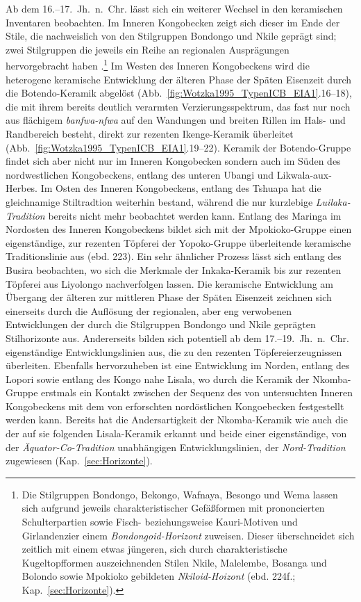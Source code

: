 Ab dem 16.--17.~Jh.~n.~Chr. lässt sich ein weiterer Wechsel in den keramischen Inventaren beobachten. Im Inneren Kongobecken zeigt sich dieser im Ende der Stile, die nachweislich von den Stilgruppen Bondongo und Nkile geprägt sind; zwei Stilgruppen die jeweils ein Reihe an regionalen Ausprägungen hervorgebracht haben \parencite[224f.]{Wotzka.1995}.\footnote{Die Stilgruppen Bondongo, Bekongo, Wafnaya, Besongo und Wema lassen sich aufgrund jeweils charakteristischer Gefäßformen mit prononcierten Schulterpartien sowie Fisch- beziehungsweise Kauri-Motiven und Girlandenzier einem \textit{Bondongoid-Horizont} zuweisen. Dieser überschneidet sich zeitlich mit einem etwas jüngeren, sich durch charakteristische Kugeltopfformen auszeichnenden Stilen Nkile, Malelembe, Bosanga und Bolondo sowie Mpokioko gebildeten \textit{Nkiloid-Hoizont} (ebd. 224f.; Kap.~\ref{sec:Horizonte}).} Im Westen des Inneren Kongobeckens wird die heterogene keramische Entwicklung der älteren Phase der Späten Eisenzeit durch die Botendo-Keramik abgelöst (Abb.~\ref{fig:Wotzka1995_TypenICB_EIA1}.16--18), die mit ihrem bereits deutlich verarmten Verzierungsspektrum, das fast nur noch aus flächigem \textit{banfwa-nfwa} auf den Wandungen und breiten Rillen im Hals- und Randbereich besteht, direkt zur rezenten Ikenge-Keramik überleitet (Abb.~\ref{fig:Wotzka1995_TypenICB_EIA1}.19--22). Keramik der Botendo-Gruppe findet sich aber nicht nur im Inneren Kongobecken sondern auch im Süden des nordwestlichen Kongobeckens, entlang des unteren Ubangi und Likwala-aux-Herbes. Im Osten des Inneren Kongobeckens, entlang des Tshuapa hat die gleichnamige Stiltradtion weiterhin bestand, während die nur kurzlebige \textit{Luilaka-Tradition} bereits nicht mehr beobachtet werden kann. Entlang des Maringa im Nordosten des Inneren Kongobeckens bildet sich mit der Mpokioko-Gruppe einen eigenständige, zur rezenten Töpferei der Yopoko-Gruppe überleitende keramische Traditionslinie aus (ebd. 223). Ein sehr ähnlicher Prozess lässt sich entlang des Busira beobachten, wo sich die Merkmale der Inkaka-Keramik bis zur rezenten Töpferei aus Liyolongo nachverfolgen lassen. Die keramische Entwicklung am Übergang der älteren zur mittleren Phase der Späten Eisenzeit zeichnen sich einerseits durch die Auflösung der regionalen, aber eng verwobenen Entwicklungen der durch die Stilgruppen Bondongo und Nkile geprägten Stilhorizonte aus. Andererseits bilden sich potentiell ab dem 17.--19.~Jh.~n.~Chr. eigenständige Entwicklungslinien aus, die zu den rezenten Töpfereierzeugnissen überleiten. Ebenfalls hervorzuheben ist eine Entwicklung im Norden, entlang des Lopori sowie entlang des Kongo nahe Lisala, wo durch die Keramik der Nkomba-Gruppe erstmals ein Kontakt zwischen der Sequenz des von \textcite{Wotzka.1995} untersuchten Inneren Kongobeckens mit dem von \textcite{LivingstoneSmith.2017} erforschten nordöstlichen Kongoebecken festgestellt werden kann. Bereits \textcite[223f.]{Wotzka.1995} hat die Andersartigkeit der Nkomba-Keramik wie auch die der auf sie folgenden Lisala-Keramik erkannt und beide einer eigenständige, von der \textit{Äquator-Co-Tradition} unabhängigen Entwicklungslinien, der \textit{Nord-Tradition} zugewiesen (Kap.~\ref{sec:Horizonte}).

